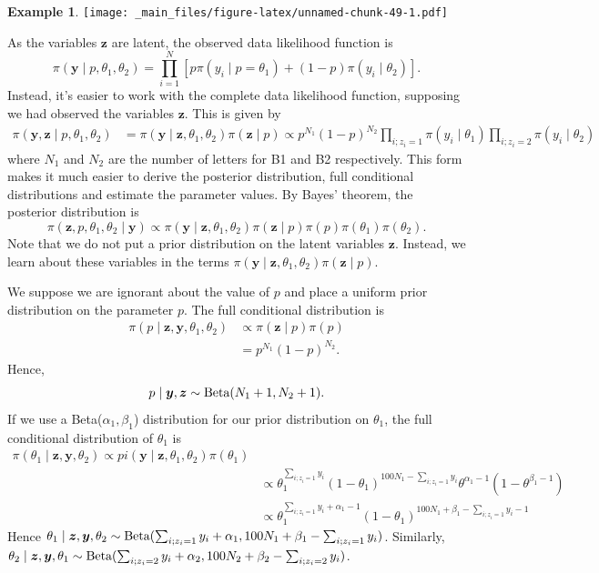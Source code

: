 \documentclass[
]{book}
\theoremstyle{definition}
\theoremstyle{definition}
\newtheorem{example}{Example}[chapter]
\theoremstyle{definition}
\theoremstyle{definition}
\theoremstyle{remark}
\begin{document}
\begin{example}
\texttt{[image: \_main\_files/figure-latex/unnamed-chunk-49-1.pdf]}

As the variables \(\boldsymbol{z}\) are latent, the observed data likelihood function is
\[
\pi(\boldsymbol{y} \mid  p, \theta_1, \theta_2) =\prod_{i=1}^N \left[ p\pi(y_i \mid p = \theta_1) + (1-p)\pi(y_i \mid \theta_2)\right].
\]
Instead, it's easier to work with the complete data likelihood function, supposing we had observed the variables \(\boldsymbol{z}\). This is given by
\begin{align*}
\pi(\boldsymbol{y}, \boldsymbol{z} \mid  p, \theta_1, \theta_2) &= \pi(\boldsymbol{y} \mid  \boldsymbol{z}, \theta_1, \theta_2)\pi(\boldsymbol{z} \mid p)
\propto p^{N_1}(1-p)^{N_2} \prod_{i; z_i = 1}\pi(y_i \mid \theta_1)\prod_{i; z_i = 2}\pi(y_i \mid \theta_2)
\end{align*}
where \(N_1\) and \(N_2\) are the number of letters for B1 and B2 respectively. This form makes it much easier to derive the posterior distribution, full conditional distributions and estimate the parameter values. By Bayes' theorem, the posterior distribution is
\[
\pi(\boldsymbol{z}, p, \theta_1, \theta_2 \mid \boldsymbol{y}) \propto \pi(\boldsymbol{y} \mid  \boldsymbol{z}, \theta_1, \theta_2)\pi(\boldsymbol{z} \mid p)\pi(p)\pi(\theta_1)\pi(\theta_2). 
\]
Note that we do not put a prior distribution on the latent variables \(\boldsymbol{z}\). Instead, we learn about these variables in the terms \(\pi(\boldsymbol{y} \mid \boldsymbol{z}, \theta_1, \theta_2)\pi(\boldsymbol{z} \mid p)\).

We suppose we are ignorant about the value of \(p\) and place a uniform prior distribution on the parameter \(p\). The full conditional distribution is
\begin{align*}
\pi(p\mid \boldsymbol{z}, \boldsymbol{y}, \theta_1, \theta_2) &\propto \pi(\boldsymbol{z} \mid p)\pi(p)\\
& = p^{N_1}(1-p)^{N_2}.
\end{align*}
Hence,
\[
p \mid \boldsymbol{y}, \boldsymbol{z} \sim \hbox{Beta}(N_1 + 1, N_2 + 1).
\]
If we use a Beta(\(\alpha_1, \beta_1\)) distribution for our prior distribution on \(\theta_1\), the full conditional distribution of \(\theta_1\) is
\begin{align*}
\pi(\theta_1 \mid \boldsymbol{z}, \boldsymbol{y}, \theta_2) \propto pi(\boldsymbol{y} \mid  \boldsymbol{z}, \theta_1, \theta_2)\pi(\theta_1) \\
&\propto \theta_1^{\sum_{i; z_i = 1}y_i}(1-\theta_1)^{100N_1 - \sum_{i; z_i = 1}y_i}\theta^{\alpha_1 - 1}(1-\theta^{\beta_1 - 1}) \\
& \propto \theta_1^{\sum_{i; z_i = 1}y_i + \alpha_1 -1 }(1-\theta_1)^{100N_1 + \beta_1 - \sum_{i; z_i = 1}y_i - 1}
\end{align*}
Hence \(\theta_1 \mid \boldsymbol{z}, \boldsymbol{y}, \theta_2 \sim \hbox{Beta}(\sum_{i; z_i = 1}y_i + \alpha_1 , 100N_1 + \beta_1 - \sum_{i; z_i = 1}y_i)\). Similarly, \(\theta_2 \mid \boldsymbol{z}, \boldsymbol{y}, \theta_1 \sim \hbox{Beta}(\sum_{i; z_i = 2}y_i + \alpha_2 , 100N_2 + \beta_2 - \sum_{i; z_i = 2}y_i)\).


\end{example}
\end{document}
